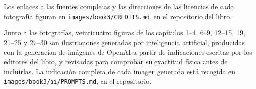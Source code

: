 Los enlaces a las fuentes completas y las direcciones de las licencias
de cada fotografía figuran en \texttt{images/book3/CREDITS.md}, en el
repositorio del libro.

\bigskip
Junto a las fotografías, veinticuatro figuras de los capítulos 1--4,
6--9, 12--15, 19, 21--25 y 27--30 son ilustraciones generadas por
inteligencia artificial, producidas con la generación de imágenes de
OpenAI a partir de indicaciones escritas por los editores del libro, y
revisadas para comprobar su exactitud física antes de incluirlas. La
indicación completa de cada imagen generada está recogida en
\texttt{images/book3/ai/PROMPTS.md}, en el repositorio.
\clearpage
